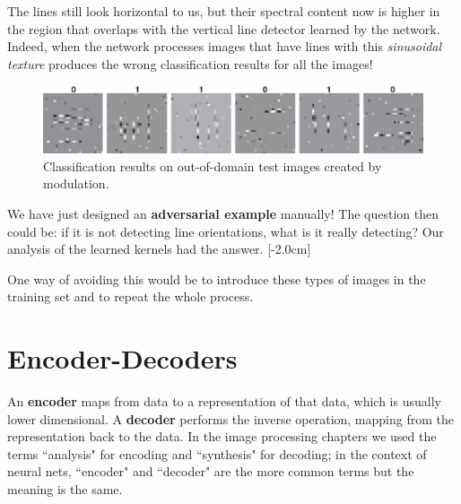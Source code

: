 The lines still look horizontal to us, but their spectral content now is higher in the region that overlaps with the vertical line detector learned by the network. Indeed, when the network processes images that have lines with this {\em sinusoidal texture} produces the wrong classification results for all the images!

\begin{figure}
\includegraphics[width=1\linewidth]{./figures/convolutional_neural_nets/oriented_bars_cnn_test_adversarial.eps}
\caption{Classification results on out-of-domain test images created by modulation.}
\end{figure}

We have just designed an {\bf adversarial example} manually! The question then could be: if it is not detecting line orientations, what is it really detecting? Our analysis of the learned kernels had the answer. [-2.0cm]

One way of avoiding this would be to introduce these types of images in the training set and to repeat the whole process.

\section{Encoder-Decoders}
An {\bf encoder} maps from data to a representation of that data, which is usually lower dimensional. A {\bf decoder} performs the inverse operation, mapping from the representation back to the data. In the image processing chapters we used the terms ``analysis" for encoding and ``synthesis" for decoding; in the context of neural nets, ``encoder" and ``decoder" are the more common terms but the meaning is the same.

